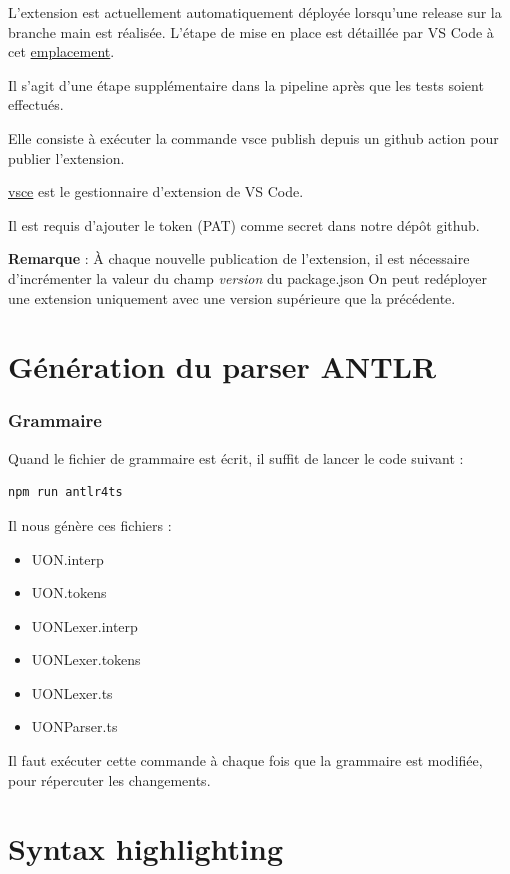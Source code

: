 \documentclass[
    iict, %
    il, %
]{heig-tb}
\begin{document}
L'extension est actuellement automatiquement déployée lorsqu'une release sur la branche main est réalisée.
L'étape de mise en place est détaillée par VS Code à cet \href{https://code.visualstudio.com/api/working-with-extensions/continuous-integration#github-actions}{emplacement}.

Il s'agit d'une étape supplémentaire dans la pipeline après que les tests soient effectués.

Elle consiste à exécuter la commande vsce publish depuis un github action pour publier l'extension.

\href{https://www.npmjs.com/package/vsce}{vsce} est le gestionnaire d'extension de VS Code.

Il est requis d'ajouter le token (PAT) comme secret dans notre dépôt github.

\textbf{Remarque } :
À chaque nouvelle publication de l'extension, il est nécessaire d'incrémenter la valeur du champ \emph{version} du package.json
On peut redéployer une extension uniquement avec une version supérieure que la précédente.

\section{Génération du parser ANTLR}
\subsubsection{Grammaire}

Quand le fichier de grammaire est écrit, il suffit de lancer le code suivant :

\begin{lstlisting}[frame=single]
    npm run antlr4ts
\end{lstlisting}

Il nous génère ces fichiers :
\begin{itemize}
    \item UON.interp
    \item UON.tokens
    \item UONLexer.interp
    \item UONLexer.tokens
    \item UONLexer.ts
    \item UONParser.ts
\end{itemize}

Il faut exécuter cette commande à chaque fois que la grammaire est modifiée, pour répercuter les changements.

\section{Syntax highlighting}
\end{document}
